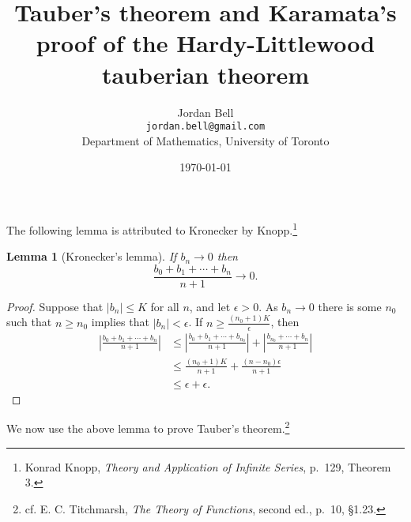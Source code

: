\documentclass{article}
\newtheorem{lemma}[theorem]{Lemma}
\begin{document}
\title{Tauber's theorem and Karamata's proof of the Hardy-Littlewood tauberian theorem}
\author{Jordan Bell\\ \texttt{jordan.bell@gmail.com}\\Department of Mathematics, University of Toronto}
\date{\today}
\maketitle

The following lemma is attributed to Kronecker by Knopp.\footnote{Konrad Knopp, {\em Theory and Application of Infinite Series}, p.~129, Theorem 3.}

\begin{lemma}[Kronecker's lemma]
If $b_n \to 0$ then
\[
\frac{b_0+b_1+\cdots+b_n}{n+1} \to 0.
\]
\label{limitlemma}
\end{lemma}
\begin{proof}
Suppose that $|b_n| \leq K$ for all $n$, and let $\epsilon>0$. As $b_n \to 0$ there is some $n_0$ such that $n \geq n_0$ implies that
$|b_n|<\epsilon$. If $n \geq \frac{(n_0+1)K}{\epsilon}$, then
\begin{align*}
\left| \frac{b_0+b_1+\cdots+b_n}{n+1} \right| &\leq 
\left| \frac{b_0+b_1+\cdots+b_{n_0}}{n+1} \right| 
+\left| \frac{b_{n_0}+\cdots+b_n}{n+1} \right|\\
&\leq \frac{(n_0+1)K}{n+1}+\frac{(n-n_0)\epsilon}{n+1}\\
&\leq \epsilon+\epsilon.
\end{align*}
\end{proof}

We now use the above lemma to prove Tauber's theorem.\footnote{cf. E. C. Titchmarsh, {\em The Theory of Functions}, second ed., p.~10, \S 1.23.}
\end{document}
